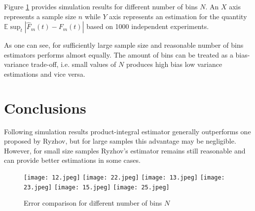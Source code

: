 \documentclass[12pt,reqno,a4paper,oneside]{article}
\theoremstyle{plain}
\theoremstyle{definition}
\theoremstyle{remark}
\begin{document}
Figure \ref{fig:1} provides simulation results for different number of bins $N$. An $X$ axis represents a sample size $n$ while $Y$ axis represents an estimation for the quantity $\mathbb E \sup _{t} |\hat F_m(t) - F_m(t)|$ based on 1000 independent experiments.

As one can see, for sufficiently large sample size and reasonable number of bins estimators performs almost equally. The amount of bins can be treated as a bias-variance trade-off, i.e. small values of $N$ produces high bias low variance estimations and vice versa.


\section{Conclusions}
\label{sec:Conclusions}
Following simulation results product-integral estimator generally outperforms one proposed by Ryzhov, but for large samples this advantage may be negligible. However, for small size samples  Ryzhov's estimator remains still reasonable and can provide better estimations in some cases.


\begin{figure}
\centering
\caption{\label{fig:1}Error comparison for different number of bins $N$}
\texttt{[image: 12.jpeg]}
\texttt{[image: 22.jpeg]}
\texttt{[image: 13.jpeg]}
\texttt{[image: 23.jpeg]}
\texttt{[image: 15.jpeg]}
\texttt{[image: 25.jpeg]}
\end{figure}
\end{document}
